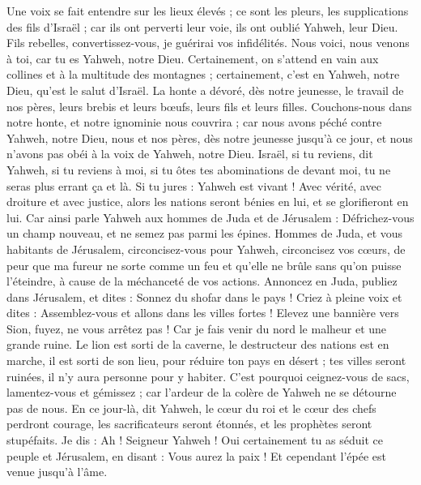 \begin{multicols}{2}
Une voix se fait entendre sur les lieux élevés ; ce sont les pleurs, les supplications des fils d'Israël ; car ils ont perverti leur voie, ils ont oublié Yahweh, leur Dieu.
Fils rebelles, convertissez-vous, je guérirai vos infidélités. Nous voici, nous venons à toi, car tu es Yahweh, notre Dieu.
Certainement, on s'attend en vain aux collines et à la multitude des montagnes ; certainement, c'est en Yahweh, notre Dieu, qu'est le salut d'Israël.
La honte a dévoré, dès notre jeunesse, le travail de nos pères, leurs brebis et leurs bœufs, leurs fils et leurs filles.
Couchons-nous dans notre honte, et notre ignominie nous couvrira ; car nous avons péché contre Yahweh, notre Dieu, nous et nos pères, dès notre jeunesse jusqu'à ce jour, et nous n'avons pas obéi à la voix de Yahweh, notre Dieu.
\VerseOne{}Israël, si tu reviens, dit Yahweh, si tu reviens à moi, si tu ôtes tes abominations de devant moi, tu ne seras plus errant ça et là.
Si tu jures : Yahweh est vivant ! Avec vérité, avec droiture et avec justice, alors les nations seront bénies en lui, et se glorifieront en lui.
Car ainsi parle Yahweh aux hommes de Juda et de Jérusalem : Défrichez-vous un champ nouveau, et ne semez pas parmi les épines.
Hommes de Juda, et vous habitants de Jérusalem, circoncisez-vous pour Yahweh, circoncisez vos cœurs, de peur que ma fureur ne sorte comme un feu et qu'elle ne brûle sans qu'on puisse l'éteindre, à cause de la méchanceté de vos actions.
Annoncez en Juda, publiez dans Jérusalem, et dites : Sonnez du shofar dans le pays ! Criez à pleine voix et dites : Assemblez-vous et allons dans les villes fortes !
Elevez une bannière vers Sion, fuyez, ne vous arrêtez pas ! Car je fais venir du nord le malheur et une grande ruine.
Le lion est sorti de la caverne, le destructeur des nations est en marche, il est sorti de son lieu, pour réduire ton pays en désert ; tes villes seront ruinées, il n'y aura personne pour y habiter.
C'est pourquoi ceignez-vous de sacs, lamentez-vous et gémissez ; car l'ardeur de la colère de Yahweh ne se détourne pas de nous.
En ce jour-là, dit Yahweh, le cœur du roi et le cœur des chefs perdront courage, les sacrificateurs seront étonnés, et les prophètes seront stupéfaits.
Je dis : Ah ! Seigneur Yahweh ! Oui certainement tu as séduit ce peuple et Jérusalem, en disant : Vous aurez la paix ! Et cependant l'épée est venue jusqu'à l'âme.

\end{multicols}
